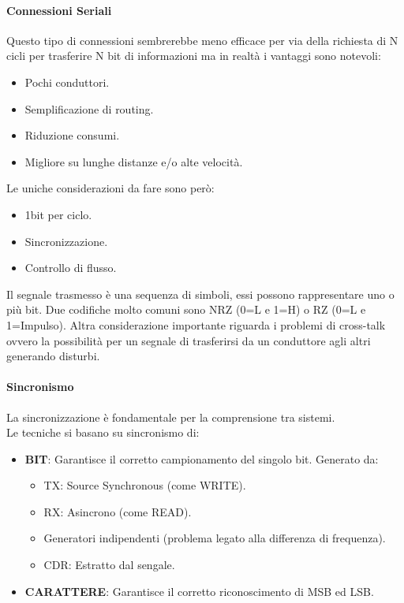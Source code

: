 \documentclass[12pt]{article}
\begin{document}
\paragraph{Connessioni Seriali}
Questo tipo di connessioni sembrerebbe meno efficace per via della richiesta di N cicli per trasferire N bit di informazioni ma in realtà i vantaggi sono notevoli:
\begin{itemize}
  \item Pochi conduttori.
  \item Semplificazione di routing.
  \item Riduzione consumi.
  \item Migliore su lunghe distanze e/o alte velocità.
\end{itemize}
Le uniche considerazioni da fare sono però:
\begin{itemize}
  \item 1bit per ciclo.
  \item Sincronizzazione.
  \item Controllo di flusso.
\end{itemize}
Il segnale trasmesso è una sequenza di simboli, essi possono rappresentare uno o più bit. Due codifiche molto comuni sono NRZ (0=L e 1=H) o RZ (0=L e 1=Impulso). Altra considerazione importante riguarda i problemi di cross-talk ovvero la possibilità per un segnale di trasferirsi da un conduttore agli altri generando disturbi.
\paragraph{Sincronismo}
La sincronizzazione è fondamentale per la comprensione tra sistemi.\\
Le tecniche si basano su sincronismo di:
\begin{itemize}
  \item \textbf{BIT}: Garantisce il corretto campionamento del singolo bit. Generato da:
  \begin{itemize}
    \item TX: Source Synchronous (come WRITE).
    \item RX: Asincrono (come READ).
    \item Generatori indipendenti (problema legato alla differenza di frequenza).
    \item CDR: Estratto dal sengale.
  \end{itemize}
  \item \textbf{CARATTERE}: Garantisce il corretto riconoscimento di MSB ed LSB.
\end{itemize} %





\end{document}
